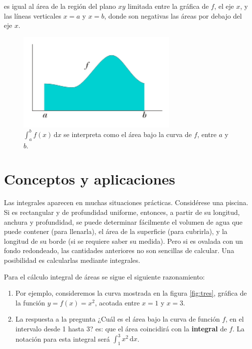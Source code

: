 \documentclass[12pt,letterpaper]{article}
\begin{document}
\noindent es igual al área de la región del plano $xy$ limitada entre la gráfica de $f$, el eje $x$, y las líneas verticales $x =a$ y $x =b$, donde son negativas las áreas por debajo del eje $x$.

\begin{figure}[h] 
	\centering
	\includegraphics[width=0.7\textwidth]{img/area-under-curve.png}
	\caption{$\int_{a}^{b} f(x) \,\mathrm{d}x$ se interpreta como el área bajo la curva de $f$, entre $a$ y $b$.}
	\label{fig:dos}
\end{figure}



\section{Conceptos y aplicaciones}

Las integrales aparecen en muchas situaciones prácticas. Considérese una piscina. Si es rectangular y de profundidad uniforme, entonces, a partir de su longitud, anchura y profundidad, se puede determinar fácilmente el volumen de agua que puede contener (para llenarla), el área de la superficie (para cubrirla), y la longitud de su borde (si se requiere saber su medida). Pero si es ovalada con un fondo redondeado, las cantidades anteriores no son sencillas de calcular. Una posibilidad es calcularlas mediante integrales. 

Para el cálculo integral de áreas se sigue el siguiente razonamiento: 

\begin{enumerate}
	\item  Por ejemplo, consideremos la curva mostrada en la figura \ref{fig:tres}, gráfica de la función $y = f ( x ) = x^2$, acotada entre $x = 1$ y $x = 3$.
   \item  La respuesta a la pregunta ¿Cuál es el área bajo la curva de función $f$, en el intervalo desde 1  hasta 3? es: que el área coincidirá con la \textbf{integral} de  $f$. La notación para esta integral será $\int_{1}^{3} x^2 \,\mathrm{d}x$.
\end{enumerate}
\end{document}
